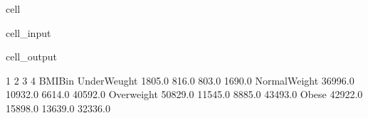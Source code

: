 \documentclass[letterpaper,10pt,english]{jupyterBook}
\begin{document}
\begin{sphinxuseclass}{cell}\begin{sphinxVerbatimInput}

\begin{sphinxuseclass}{cell_input}
\begin{sphinxVerbatim}[commandchars=\\\{\}]
   
  \PYG{p}{[}\PYG{p}{[} \PYG{p}{]}\PYG{p}{]}
   \PYG{p}{[}\PYG{p}{]}
\end{sphinxVerbatim}

\end{sphinxuseclass}\end{sphinxVerbatimInput}
\begin{sphinxVerbatimOutput}

\begin{sphinxuseclass}{cell_output}
\begin{sphinxVerbatim}[commandchars=\\\{\}]
                    1        2        3        4
BMI\PYGZus{}Bin                                         
UnderWeught    1805.0    816.0    803.0   1690.0
NormalWeight  36996.0  10932.0   6614.0  40592.0
Overweight    50829.0  11545.0   8885.0  43493.0
Obese         42922.0  15898.0  13639.0  32336.0
\end{sphinxVerbatim}

\noindent{}

\end{sphinxuseclass}\end{sphinxVerbatimOutput}

\end{sphinxuseclass}
\end{document}
